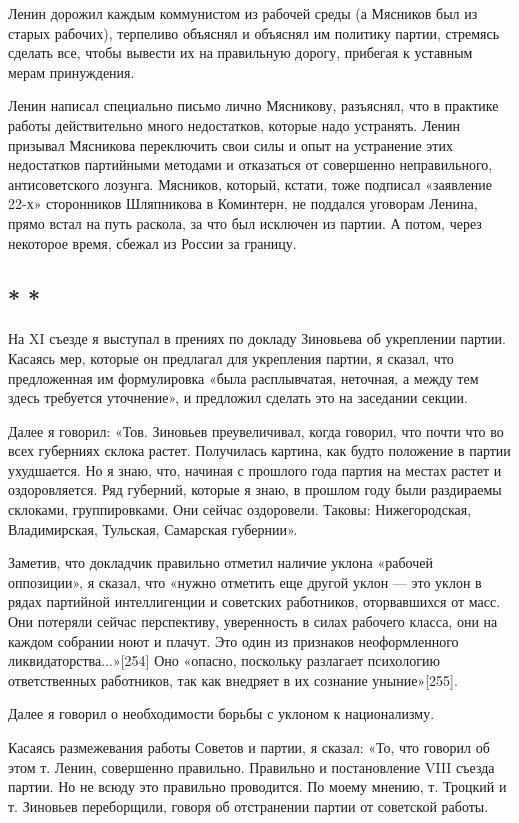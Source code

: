 \documentclass[12pt, a4paper, openany]{book}
\begin{document}
Ленин дорожил каждым коммунистом из рабочей среды (а Мясников был из старых рабочих), терпеливо объяснял и объяснял им политику партии, стремясь сделать все, чтобы вывести их на правильную дорогу, прибегая к уставным мерам принуждения.

Ленин написал специально письмо лично Мясникову, разъяснял, что в практике работы действительно много недостатков, которые надо устранять. Ленин призывал Мясникова переключить свои силы и опыт на устранение этих недостатков партийными методами и отказаться от совершенно неправильного, антисоветского лозунга. Мясников, который, кстати, тоже подписал «заявление 22-х» сторонников Шляпникова в Коминтерн, не поддался уговорам Ленина, прямо встал на путь раскола, за что был исключен из партии. А потом, через некоторое время, сбежал из России за границу.

\subsection*{\center * * *}

На XI съезде я выступал в прениях по докладу Зиновьева об укреплении партии. Касаясь мер, которые он предлагал для укрепления партии, я сказал, что предложенная им формулировка «была расплывчатая, неточная, а между тем здесь требуется уточнение», и предложил сделать это на заседании секции.

Далее я говорил: «Тов. Зиновьев преувеличивал, когда говорил, что почти что во всех губерниях склока растет. Получилась картина, как будто положение в партии ухудшается. Но я знаю, что, начиная с прошлого года партия на местах растет и оздоровляется. Ряд губерний, которые я знаю, в прошлом году были раздираемы склоками, группировками. Они сейчас оздоровели. Таковы: Нижегородская, Владимирская, Тульская, Самарская губернии».

Заметив, что докладчик правильно отметил наличие уклона «рабочей оппозиции», я сказал, что «нужно отметить еще другой уклон — это уклон в рядах партийной интеллигенции и советских работников, оторвавшихся от масс. Они потеряли сейчас перспективу, уверенность в силах рабочего класса, они на каждом собрании ноют и плачут. Это один из признаков неоформленного ликвидаторства...»[254] Оно «опасно, поскольку разлагает психологию ответственных работников, так как внедряет в их сознание уныние»[255].

Далее я говорил о необходимости борьбы с уклоном к национализму.

Касаясь размежевания работы Советов и партии, я сказал: «То, что говорил об этом т. Ленин, совершенно правильно. Правильно и постановление VIII съезда партии. Но не всюду это правильно проводится. По моему мнению, т. Троцкий и т. Зиновьев переборщили, говоря об отстранении партии от советской работы.
\end{document}

